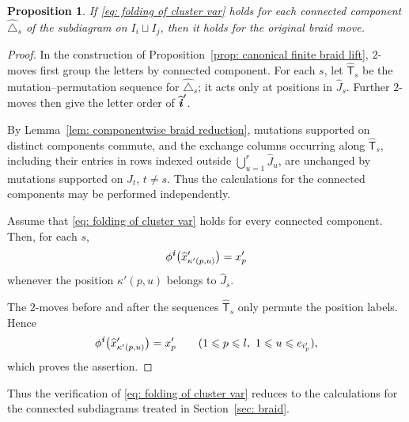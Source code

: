 \documentclass[12pt, leqno]{amsart}
\numberwithin{equation}{section}
\theoremstyle{plain}
\newtheorem{proposition}[lemma]{Proposition}
\theoremstyle{definition}
\renewcommand{\le}{\leqslant}
\newcommand{\Dynkin}{\triangle}
\newcommand{\ii}{ \textbf{\textit{i}}}
\newcommand{\hJ}{\widehat{J}}
\newcommand{\hx}{\widehat{x}}
\newcommand{\hii}{{\widehat{\ii}}}
\newcommand{\sfT}{\mathsf{T}}
\newcommand{\hsfT}{\widehat{\sfT}}
\newcommand{\hDynkin}{{\widehat{\Dynkin}}}
\begin{document}
\begin{proposition}\label{prop: reduction to connected configurations}
 If \eqref{eq: folding of cluster var} holds for each connected
component $\hDynkin_s$ of the subdiagram on $I_i\sqcup I_j$,
then it holds for the original braid move.
\end{proposition}

\begin{proof}
In the construction of Proposition~\ref{prop: canonical finite braid lift},
$2$-moves first group the letters by connected component.
For each $s$, let $\hsfT_s$ be the mutation--permutation sequence
for $\hDynkin_s$; it acts only at positions in $\hJ_s$.
Further $2$-moves then give the letter order of $\hii'$.

By Lemma~\ref{lem: componentwise braid reduction}, mutations supported
on distinct components commute, and the exchange columns occurring
along $\hsfT_s$, including their entries in   rows indexed outside $\bigcup_{u=1}^r\hJ_u$, are unchanged by mutations supported on $\hJ_t$, $t\ne s$.   
Thus the calculations for the connected components
may be performed independently.

 Assume that \eqref{eq: folding of cluster var} holds for every connected component.{}  Then, for each $s$,
\[
\phi^\ii\bigl(\hx'_{\kappa'(p,u)}\bigr)=x'_p
\]
whenever the position $\kappa'(p,u)$ belongs to $\hJ_s$.

The $2$-moves before and after the sequences $\hsfT_s$
only permute the position labels.
Hence
\[
\phi^\ii\bigl(\hx'_{\kappa'(p,u)}\bigr)=x'_p
\qquad
(1\le p\le l,\ 1\le u\le e_{i'_p}),
\]
which proves the assertion.
\end{proof}

Thus the verification of \eqref{eq: folding of cluster var} reduces to the calculations for the connected subdiagrams treated in Section~\ref{sec: braid}.


{}
\end{document}
